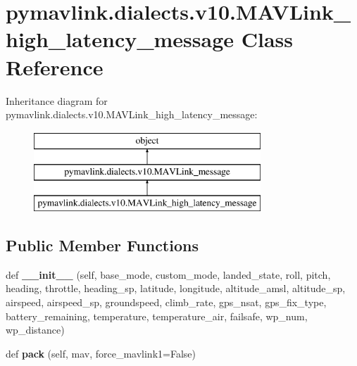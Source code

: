\hypertarget{classpymavlink_1_1dialects_1_1v10_1_1MAVLink__high__latency__message}{}\section{pymavlink.\+dialects.\+v10.\+M\+A\+V\+Link\+\_\+high\+\_\+latency\+\_\+message Class Reference}
\label{classpymavlink_1_1dialects_1_1v10_1_1MAVLink__high__latency__message}
Inheritance diagram for pymavlink.\+dialects.\+v10.\+M\+A\+V\+Link\+\_\+high\+\_\+latency\+\_\+message\+:\begin{figure}[H]
\begin{center}
\leavevmode
\includegraphics[height=3.000000cm]{classpymavlink_1_1dialects_1_1v10_1_1MAVLink__high__latency__message}
\end{center}
\end{figure}
\subsection*{Public Member Functions}
\begin{DoxyCompactItemize}
\item 
\mbox{\label{classpymavlink_1_1dialects_1_1v10_1_1MAVLink__high__latency__message_a0ffd3c8c814eb51a69c6a3754225532f}} 
def {\bfseries \+\_\+\+\_\+init\+\_\+\+\_\+} (self, base\+\_\+mode, custom\+\_\+mode, landed\+\_\+state, roll, pitch, heading, throttle, heading\+\_\+sp, latitude, longitude, altitude\+\_\+amsl, altitude\+\_\+sp, airspeed, airspeed\+\_\+sp, groundspeed, climb\+\_\+rate, gps\+\_\+nsat, gps\+\_\+fix\+\_\+type, battery\+\_\+remaining, temperature, temperature\+\_\+air, failsafe, wp\+\_\+num, wp\+\_\+distance)
\item 
\mbox{\label{classpymavlink_1_1dialects_1_1v10_1_1MAVLink__high__latency__message_a97be606dcae511220acb02a3ffecc236}} 
def {\bfseries pack} (self, mav, force\+\_\+mavlink1=False)
\end{DoxyCompactItemize}
